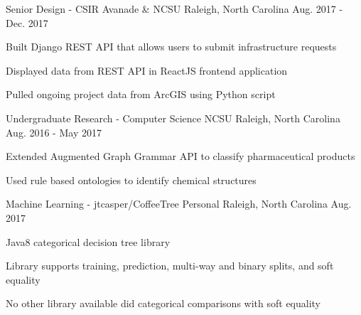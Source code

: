 
\begin{cventries}
	
\cventry
	{Senior Design - CSIR} %
	{Avanade \& NCSU} %
	{Raleigh, North Carolina} %
	{Aug. 2017 - Dec. 2017} %
	{
	\begin{cvitems} %
		\item {Built Django REST API that allows users to submit infrastructure requests}
		\item {Displayed data from REST API in ReactJS frontend application}
		\item {Pulled ongoing project data from ArcGIS using Python script}
	\end{cvitems}
	}
	
\cventry
	{Undergraduate Research - Computer Science} %
	{NCSU} %
	{Raleigh, North Carolina} %
	{Aug. 2016 - May 2017} %
	{
		\begin{cvitems} %
			\item {Extended Augmented Graph Grammar API to classify pharmaceutical products}
			\item {Used rule based ontologies to identify chemical structures}
		\end{cvitems}
	}


\cventry
	{Machine Learning - jtcasper/CoffeeTree} %
	{Personal} %
	{Raleigh, North Carolina} %
	{Aug. 2017} %
	{
		\begin{cvitems}
			\item {Java8 categorical decision tree library}
			\item {Library supports training, prediction, multi-way and binary splits, and soft equality}
			\item {No other library available did categorical comparisons with soft equality}
		\end{cvitems}
	}


\end{cventries}

